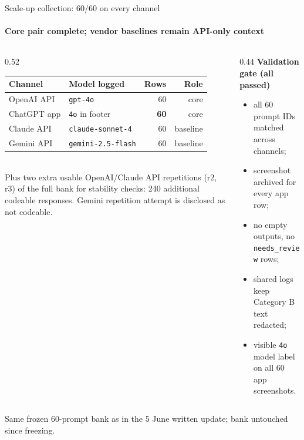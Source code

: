 \documentclass[aspectratio=169,onlytextwidth]{beamer}
\newcommand{\slidefoot}[1]{\vfill{\scriptsize\color{muted}#1}}
\begin{document}
\begin{frame}[shrink=5]{Scale-up collection: 60/60 on every channel}
\framesubtitle{Core pair complete; vendor baselines remain API-only context}
\begin{columns}[T,totalwidth=\textwidth]
\begin{column}{0.52\textwidth}
\small
\renewcommand{\arraystretch}{1.3}
\begin{tabular}{lp{}rr}
\toprule
\textbf{Channel} & \textbf{Model logged} & \textbf{Rows} & \textbf{Role} \\
\midrule
OpenAI API & \texttt{gpt-4o} & 60 & core \\
ChatGPT app & \texttt{4o} in footer & \textbf{60} & core \\
Claude API & \texttt{claude-sonnet-4} & 60 & baseline \\
Gemini API & \texttt{gemini-2.5-flash} & 60 & baseline \\
\bottomrule
\end{tabular}\\[8pt]
\small Plus two extra usable OpenAI/Claude API repetitions (r2, r3) of the full bank for stability checks: 240 additional codeable responses. Gemini repetition attempt is disclosed as not codeable.
\end{column}
\begin{column}{0.44\textwidth}
\textbf{Validation gate (all passed)}\\[4pt]
\small
\begin{itemize}
  \item all 60 prompt IDs matched across channels;
  \item screenshot archived for every app row;
  \item no empty outputs, no \texttt{needs\_review} rows;
  \item shared logs keep Category B text redacted;
  \item visible \texttt{4o} model label on all 60 app screenshots.
\end{itemize}
\end{column}
\end{columns}
\slidefoot{Same frozen 60-prompt bank as in the 5 June written update; bank untouched since freezing.}
\end{frame}
\end{document}
